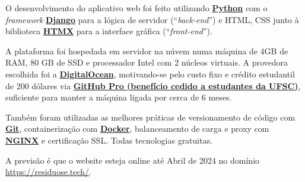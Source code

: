 O desenvolvimento do aplicativo web foi feito utilizando \href{https://www.python.org/}{\textbf{Python}} com o \textit{framework} \href{https://www.djangoproject.com/}{\textbf{Django}} para a lógica de servidor (“\textit{back-end}”) e \gls{HTML}, \gls{CSS} junto à biblioteca \href{https://htmx.org/}{\textbf{HTMX}} para a interface gráfica (“\textit{front-end}”).

A plataforma foi hospedada em servidor na núvem numa máquina de 4GB de \gls{RAM}, 80 GB de \gls{SSD} e processador Intel com 2 núcleos virtuais. A provedora escolhida foi a \href{https://www.digitalocean.com/}{\textbf{DigitalOcean}}, motivando-se pelo custo fixo e crédito estudantil de 200 dólares via \href{https://education.github.com/pack}{\textbf{GitHub Pro (benefício cedido a estudantes da UFSC)}}, suficiente para manter a máquina ligada por cerca de 6 meses.

Também foram utilizadas as melhores práticas de versionamento de código com \href{https://git-scm.com/}{\textbf{Git}}, containerização com \href{https://www.docker.com/}{\textbf{Docker}}, balanceamento de carga e proxy com \href{https://www.nginx.com/}{\textbf{NGINX}} e certificação \gls{SSL}. Todas tecnologias gratuitas.

A previsão é que o website esteja online até Abril de 2024 no domínio \url{https://residuose.tech/}.